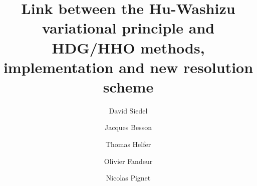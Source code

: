 \documentclass[3p,times,fleqn]{elsarticle}
\begin{document}

\begin{frontmatter}



\dochead{}

  \title{ Link between the Hu-Washizu variational
    principle and HDG/HHO methods, implementation and new resolution
    scheme }


\author[lsc]{David Siedel}
\author[psl]{Jacques Besson}
\author[lsc]{Thomas Helfer}
\author[lm2s,imsia]{Olivier Fandeur}
\author[edf]{Nicolas Pignet}

\address[lsc]{CEA, DES/IRESNE/DEC/SESC/LSC, Département d'Études des Combustibles, Cadarache, France}
\address[psl]{MINES ParisTech, PSL Research University, MAT - Centre des matériaux, CNRS UMR 7633, Evry BP 87 9103, France}
\address[lm2s]{CEA, ISAS/DES/DM2S/SEMT/LM2S, Département de Modélisation des Systèmes et des Structures, Saclay, France}
\address[imsia]{IMSIA, UMR 8193, CNRS-EDF-CEA-ENSTA}
\address[edf]{EDF R\&D ERMES, 7 Boulevard Gaspard Monge, 91120 Palaiseau, France}

\address{}


\end{frontmatter}
\end{document}
